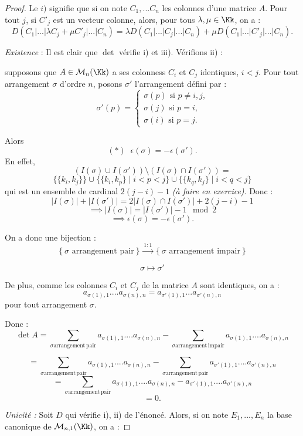 \documentclass[class=report,crop=false]{standalone}
\newcommand{\exoo}{\emph{(à faire en exercice)}}
\newcommand{\sta}{\stackrel}
\begin{document}
\begin{proof}
Le $i)$ signifie que si on note $C_1,...C_n$ les colonnes d'une matrice $A$. Pour tout $j$, si $C'_j$ est un vecteur colonne, alors, pour tous $\lambda,\mu \in \Kk$, on a :
\[D(C_1|...|\lambda C_j + \mu C'_j|...|C_n) = \lambda D(C_1|...|C_j|...|C_n) + \mu D(C_1|...|C'_j|...|C_n).\]

{\it Existence} : Il est clair que $\det$ vérifie i) et iii). Vérifions ii) :

supposons que $A\in\mathcal{M}_{n}(\Kk)$ a ses colonness $C_i$ et $C_j$ identiques, $i<j$. Pour tout arrangement $\sigma$ d'ordre $n$, posons $\sigma'$ l'arrangement défini par :
\[\sigma'(p)=\left\{\begin{array}{l}
\sigma(p) \mbox{ si $p\neq i,j$,}\\
\sigma(j) \mbox{ si $p=i$,}\\
\sigma(i) \mbox{ si $p=j$.}
\end{array}\right.\]  

Alors \[(*)\;\; \epsilon(\sigma) = -\epsilon(\sigma').\] En effet,
\[(I(\sigma) \cup I(\sigma') )\setminus (I(\sigma) \cap I(\sigma') ) = \]
\[\{\{k_i,k_j\}\} \cup \{\{k_i,k_p\}\mid i <p < j\}\cup\{\{k_q,k_j\}\mid i <q < j\} \]
qui est un ensemble de cardinal $2(j-i)-1$
\exoo . Donc :
\[|I(\sigma)| + |I(\sigma')|=  2|I(\sigma) \cap I(\sigma') | + 2(j-i)-1\]
\[\implies |I(\sigma)| = |I(\sigma')| - 1 \mod 2\]
\[\implies \epsilon(\sigma) = -\epsilon(\sigma').\]

On a donc une bijection :
\[\left\{\sigma \mbox{ arrangement pair}\right\} \sta{1:1}{\to } \left\{\sigma \mbox{ arrangement impair}\right\}\]

\[\sigma \mapsto \sigma'\]

De plus, comme les colonnes $C_i$ et $C_j$ de la matrice $A$ sont identiques, on a :
\[a_{\sigma(1),1}....a_{\sigma(n),n} = a_{\sigma'(1),1}...a_{\sigma'(n),n}\]
pour tout arrangement $\sigma$. 

Donc :
\[\det A = \sum_{\sigma \mathrm{ arrangement\, pair}} a_{\sigma(1),1}....a_{\sigma(n),n} - \sum_{\sigma \mathrm{ arrangement\, impair}} a_{\sigma(1),1}....a_{\sigma(n),n} \]

\[= \sum_{\sigma \mathrm{ arrangement\, pair}} a_{\sigma(1),1}....a_{\sigma(n),n} - \sum_{\sigma \mathrm{ arrangement\, pair}} a_{\sigma'(1),1}....a_{\sigma'(n),n}\]
\[= \sum_{\sigma \mathrm{ arrangement\, pair}} a_{\sigma(1),1}....a_{\sigma(n),n} - a_{\sigma'(1),1}....a_{\sigma'(n),n}\]
\[=0 .\]

{\it Unicité :} Soit $D$ qui vérifie i), ii) de l'énoncé. Alors, si on note $E_1,...,E_n$ la base canonique de $\mathcal{M}_{n,1}(\Kk)$, on a :


\end{proof}
\end{document}
